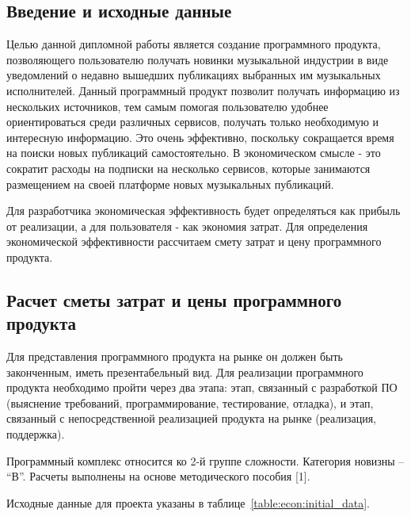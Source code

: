 \subsection{Введение и исходные данные}

Целью данной дипломной работы является создание программного продукта, позволяющего пользователю получать новинки музыкальной индустрии в виде уведомлений о недавно вышедших публикациях выбранных им музыкальных исполнителей. Данный программный продукт позволит получать информацию из нескольких источников, тем самым помогая пользователю удобнее ориентироваться среди различных сервисов, получать только необходимую и интересную информацию. Это очень эффективно, поскольку сокращается время на поиски новых публикаций самостоятельно. В экономическом смысле - это сократит расходы на подписки на несколько сервисов, которые занимаются размещением на своей платформе новых музыкальных публикаций.

Для разработчика экономическая эффективность будет определяться как прибыль от реализации, а для пользователя - как экономия затрат. Для определения экономической эффективности рассчитаем смету затрат и цену программного продукта.

\subsection{Расчет сметы затрат и цены программного продукта}

Для представления программного продукта на рынке он должен быть законченным, иметь презентабельный вид. Для реализации программного продукта необходимо пройти через два этапа: этап, связанный с разработкой ПО (выяснение требований, программирование, тестирование, отладка), и этап, связанный с непосредственной реализацией продукта на рынке (реализация, поддержка).

Программный комплекс относится ко 2-й группе сложности. Категория новизны – “В”. Расчеты выполнены на основе методического пособия [1].

Исходные данные для проекта указаны в таблице~\ref{table:econ:initial_data}.

